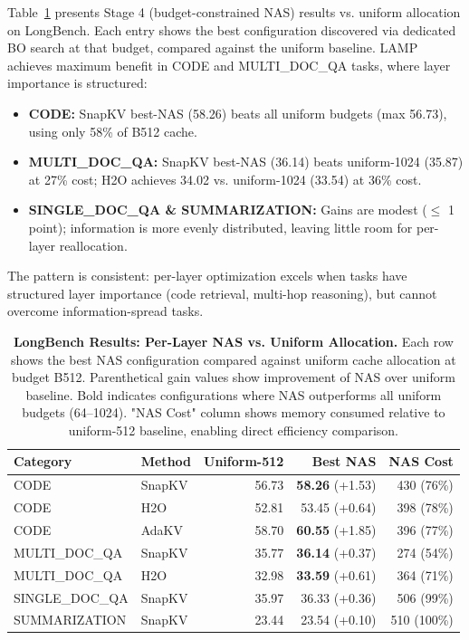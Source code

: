 \documentclass[11pt]{article}
\begin{document}
Table~\ref{tab:longbench-summary} presents Stage 4 (budget-constrained NAS) results vs. uniform allocation on LongBench. Each entry shows the best configuration discovered via dedicated BO search at that budget, compared against the uniform baseline. LAMP achieves maximum benefit in CODE and MULTI\_DOC\_QA tasks, where layer importance is structured:

\begin{itemize}
\item \textbf{CODE:} SnapKV best-NAS (58.26) beats all uniform budgets (max 56.73), using only 58\% of B512 cache.
\item \textbf{MULTI\_DOC\_QA:} SnapKV best-NAS (36.14) beats uniform-1024 (35.87) at 27\% cost; H2O achieves 34.02 vs. uniform-1024 (33.54) at 36\% cost.
\item \textbf{SINGLE\_DOC\_QA \& SUMMARIZATION:} Gains are modest ($\leq$ 1 point); information is more evenly distributed, leaving little room for per-layer reallocation.
\end{itemize}

The pattern is consistent: per-layer optimization excels when tasks have structured layer importance (code retrieval, multi-hop reasoning), but cannot overcome information-spread tasks.

\begin{table}[t]
  \centering
  \small
  \setlength{\tabcolsep}{12pt}
  \begin{tabular}{@{} l l r r r @{}}
    \toprule
    \textbf{Category} & \textbf{Method} & \textbf{Uniform-512} & \textbf{Best NAS} & \textbf{NAS Cost} \\
    \midrule
    \rowcolor{gray!10}
    CODE & SnapKV & 56.73 & \textbf{58.26} (+1.53) & 430 (76\%) \\
    CODE & H2O & 52.81 & 53.45 (+0.64) & 398 (78\%) \\
    \rowcolor{gray!10}
    CODE & AdaKV & 58.70 & \textbf{60.55} (+1.85) & 396 (77\%) \\
    MULTI\_DOC\_QA & SnapKV & 35.77 & \textbf{36.14} (+0.37) & 274 (54\%) \\
    \rowcolor{gray!10}
    MULTI\_DOC\_QA & H2O & 32.98 & \textbf{33.59} (+0.61) & 364 (71\%) \\
    SINGLE\_DOC\_QA & SnapKV & 35.97 & 36.33 (+0.36) & 506 (99\%) \\
    \rowcolor{gray!10}
    SUMMARIZATION & SnapKV & 23.44 & 23.54 (+0.10) & 510 (100\%) \\
    \bottomrule
  \end{tabular}
  \caption{\textbf{LongBench Results: Per-Layer NAS vs. Uniform Allocation.} Each row shows the best NAS configuration compared against uniform cache allocation at budget B512. Parenthetical gain values show improvement of NAS over uniform baseline. Bold indicates configurations where NAS outperforms all uniform budgets (64–1024). "NAS Cost" column shows memory consumed relative to uniform-512 baseline, enabling direct efficiency comparison.}
  \label{tab:longbench-summary}
\end{table}
\end{document}

